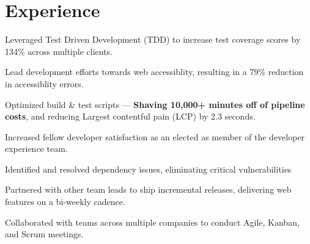 \documentclass[]{resume-class}
\begin{document}

\vspace{8}

\begin{minipage}[t]{0.60\textwidth}

\section{Experience}
\sectiontitlespacer
{}
\vspace{\topsep}
\begin{tightemize}
\item{Leveraged Test Driven Development (TDD) to increase test coverage scores by 134\% across multiple clients.}
\item{Lead development efforts towards web accessiblity, resulting in a 79\% reduction in accessiblity errors.}
\item{Optimized build \& test scripts — \textbf{Shaving 10,000+ minutes off of pipeline costs}, and reducing Largest contentful pain (LCP) by 2.3 seconds.}
\item{Increased fellow developer satisfaction as an elected as member of the developer experience team.}
\item{Identified and resolved dependency issues, eliminating critical vulnerabilities}
\item{Partnered with other team leads to ship incremental releases, delivering web features on a bi-weekly cadence.}
\item{Collaborated with teams across multiple companies to conduct Agile, Kanban, and Scrum meetings.}     
\end{tightemize}
\sectionsep


\end{minipage}
\end{document}
